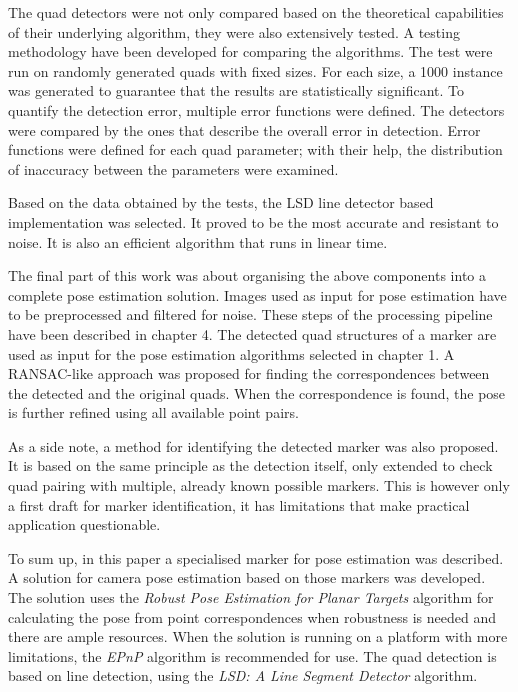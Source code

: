 The quad detectors were not only compared based on the theoretical capabilities of their underlying algorithm, they were also extensively tested.
A testing methodology have been developed for comparing the algorithms.
The test were run on randomly generated quads with fixed sizes.
For each size, a 1000 instance was generated to guarantee that the results are statistically significant.
To quantify the detection error, multiple error functions were defined.
The detectors were compared by the ones that describe the overall error in detection.
Error functions were defined for each quad parameter; with their help, the distribution of inaccuracy between the parameters were examined.

Based on the data obtained by the tests, the LSD\cite{LSDDet} line detector based implementation was selected.
It proved to be the most accurate and resistant to noise.
It is also an efficient algorithm that runs in linear time.

The final part of this work was about organising the above components into a complete pose estimation solution.
Images used as input for pose estimation have to be preprocessed and filtered for noise.
These steps of the processing pipeline have been described in chapter 4.
The detected quad structures of a marker are used as input for the pose estimation algorithms selected in chapter 1.
A RANSAC-like approach was proposed for finding the correspondences between the detected and the original quads.
When the correspondence is found, the pose is further refined using all available point pairs.

As a side note, a method for identifying the detected marker was also proposed.
It is based on the same principle as the detection itself, only extended to check quad pairing with multiple, already known possible markers.
This is however only a first draft for marker identification, it has limitations that make practical application questionable.

To sum up, in this paper a specialised marker for pose estimation was described.
A solution for camera pose estimation based on those markers was developed.
The solution uses the \textit{Robust Pose Estimation for Planar Targets} algorithm for calculating the pose from point correspondences when robustness is needed and there are ample resources.
When the solution is running on a platform with more limitations, the \textit{EPnP} algorithm is recommended for use.
The quad detection is based on line detection, using the \textit{LSD: A Line Segment Detector} algorithm.

